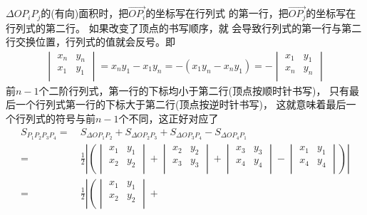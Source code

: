 \begin{itemize}[leftmargin=\inteval{\myitemleftmargin}pt,itemsep=
   \inteval{\myitemitempsep}pt,topsep=\inteval{\myitemtopsep}pt]
$ \Delta OP_iP_j $的(有向)面积时，把$ \vec{OP_i} $的坐标写在行列式
的第一行，把$ \vec{OP_j} $的坐标写在行列式的第二行。
如果改变了顶点的书写顺序，就
会导致行列式的第一行与第二行交换位置，行列式的值就会反号。即
\begin{gather*}
    \begin{vmatrix}
        {x_{n}} & {y_{n}} \\
        {x_1} & {y_1} \\
    \end{vmatrix} =x_ny_1-x_1y_n=-(x_1y_n-x_ny_1)=-
    \begin{vmatrix}
        {x_1} & {y_1} \\
        {x_{n}} & {y_{n}} \\
    \end{vmatrix}
\end{gather*}
前$ n-1 $个二阶行列式，第一行的下标均小于第二行(顶点按顺时针书写)，
只有最后一个行列式第一行的下标大于第二行(顶点按逆时针书写)，
这就意味着最后一个行列式的符号与前$ n-1 $个不同，这正好对应了
\begin{align*}
    S_{P_1P_2P_3P_4}=&\ S_{\Delta OP_1P_2}+S_{\Delta OP_2P_3}+
    S_{\Delta OP_3P_4}-S_{\Delta OP_4P_1} \\
    =&\ \frac{1}{2} \left|\left(
    \begin{vmatrix}
        {x_1} & {y_1} \\
        {x_2} & {y_2} \\
    \end{vmatrix}+
    \begin{vmatrix}
        {x_2} & {y_2} \\
        {x_3} & {y_3} \\
    \end{vmatrix}+
    \begin{vmatrix}
        {x_3} & {y_3} \\
        {x_4} & {y_4} \\
    \end{vmatrix} -
    \begin{vmatrix}
        {x_1} & {y_1} \\
        {x_4} & {y_4} \\
    \end{vmatrix}   \right) \right| \\
    =&\ \frac{1}{2} \left|\left(
    \begin{vmatrix}
        {x_1} & {y_1} \\
        {x_2} & {y_2} \\
    \end{vmatrix}+

\end{align*}
\end{itemize}
